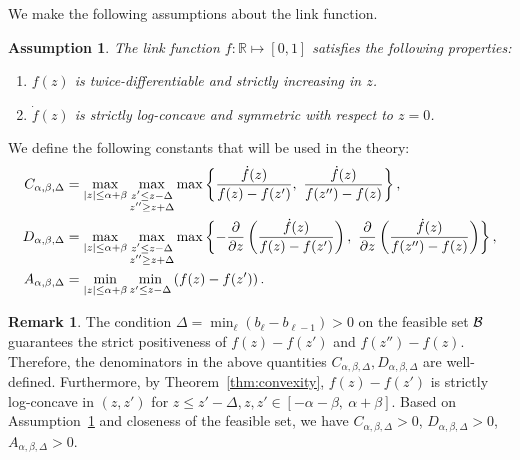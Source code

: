 \documentclass[11pt]{article}
\theoremstyle{plain}
\newtheorem{assumption}{Assumption}
\theoremstyle{definition}
\newtheorem{rmk}{Remark}
\begin{document}
We make the following assumptions about the link function.
\begin{assumption}\label{ass:joint}
The link function $f\colon \mathbb{R}\mapsto [0,1]$ satisfies the following properties:
\begin{enumerate}
\item $f(z)$ is twice-differentiable and strictly increasing in $z$.
\item $\dot{f}(z)$ is strictly log-concave and symmetric with respect to $z=0$.
\end{enumerate}
\end{assumption}

We define the following constants that will be used in the theory:
\begin{align}\label{eq:constantZ}
C_{\alpha,\beta,\Delta}&=\max_{|z|\leq \alpha+\beta}\max_{\substack{z'\leq z-\Delta\\z''\geq z+\Delta}}\max\left\{ {\dot{f}(z) \over f(z)-f(z')},\ {\dot{f}(z) \over f(z'')-f(z)}\right\},\\
D_{\alpha,\beta,\Delta}&=\max_{|z|\leq \alpha+\beta}\max_{\substack{z'\leq z-\Delta\\z''\geq z+\Delta}}\max\left\{- {\partial\over \partial z}\left({\dot{f}(z) \over f(z)-f(z')}\right),\  {\partial\over \partial z}\left({\dot{f}(z) \over f(z'')-f(z)}\right) \right\},\\
A_{\alpha,\beta,\Delta}&=\min_{|z|\leq \alpha+\beta}\min_{z'\leq z-\Delta} \left(f(z)-f(z')\right).
\end{align}

\begin{rmk}
The condition $\Delta=\min_{\ell}(b_{\ell}-b_{\ell-1})>0$ on the feasible set $\mathcal{B}$ guarantees the strict positiveness of $f(z)-f(z')$ and $f(z'')-f(z)$. Therefore, the denominators in the above quantities $C_{\alpha,\beta,\Delta}, D_{\alpha,\beta,\Delta}$ are well-defined. Furthermore, by Theorem~\ref{thm:convexity}, $f(z)-f(z')$ is strictly log-concave in $(z,z')$ for $z\leq z'-\Delta, z,z'\in[-\alpha-\beta,\ \alpha+\beta]$. Based on Assumption~\ref{ass:joint} and closeness of the feasible set, we have $C_{\alpha,\beta,\Delta}>0$, $D_{\alpha,\beta,\Delta}>0$, $A_{\alpha,\beta,\Delta}>0$.
\end{rmk}
\end{document}
